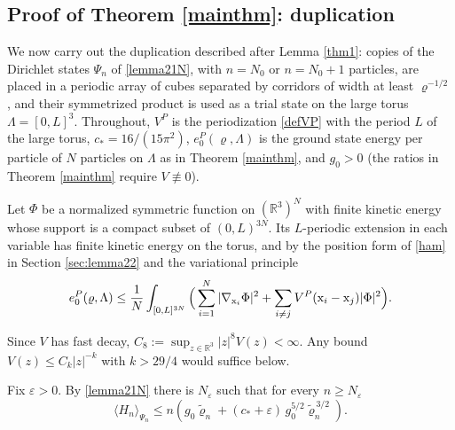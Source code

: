 \documentclass[11pt]{article}
\numberwithin{equation}{section}
\newcommand{\e}{\varepsilon}
\newcommand{\x}{{\rm x}}
\newcommand{\beq}{\begin{equation}}
\newcommand{\eeq}{\end{equation}}
\newcommand\R{{\mathbb R}}
\renewcommand\rho\varrho
\theoremstyle{definition}
\begin{document}
\subsection{Proof of Theorem \ref{mainthm}: duplication}\label{subsec:dup}

We now carry out the duplication described after Lemma \ref{thm1}: copies of the Dirichlet states $\Psi_n$ of \eqref{lemma21N}, with $n=N_0$ or $n=N_0+1$ particles,
are placed in a periodic array of cubes separated by corridors of width at least $\rho^{-1/2}$, and their symmetrized product is used as a trial state on the large torus $\Lambda=[0,L]^3$.
Throughout, $V^P$ is the periodization \eqref{defVP} with the period $L$ of the large torus, $c_*=16/(15\pi^2)$, $e_0^P(\rho,\Lambda)$ is the ground state energy per particle of $N$ particles on $\Lambda$ as in Theorem \ref{mainthm},
and $g_0>0$ (the ratios in Theorem \ref{mainthm} require $V\not\equiv0$).

\smallskip{}
Let $\Phi$ be a normalized symmetric function on $(\R^3)^N$ with finite kinetic energy whose support is a compact subset of $(0,L)^{3N}$.
Its $L$-periodic extension in each variable has finite kinetic energy on the torus, and by the position form of \eqref{ham} in Section \ref{sec:lemma22} and the variational principle
\beq\label{ePDir}
e_0^P(\rho,\Lambda)\leq\frac1N\int_{[0,L]^{3N}}\Big(\sum_{i=1}^N|\nabla_{\x_i}\Phi|^2+\sum_{i\neq j}V^P(\x_i-\x_j)|\Phi|^2\Big).
\eeq

\smallskip{}
Since $V$ has fast decay, $C_8:=\sup_{z\in\R^3}|z|^8V(z)<\infty$. Any bound $V(z)\leq C_k|z|^{-k}$ with $k>29/4$ would suffice below.

\smallskip{}
Fix $\e>0$. By \eqref{lemma21N} there is $N_\e$ such that for every $n\geq N_\e$
\beq\label{dupbox}
\langle H_n\rangle_{\Psi_n}\leq n\left(g_0\widetilde\rho_n+(c_*+\e)\,g_0^{5/2}\widetilde\rho_n^{\,3/2}\right).
\eeq
\end{document}
